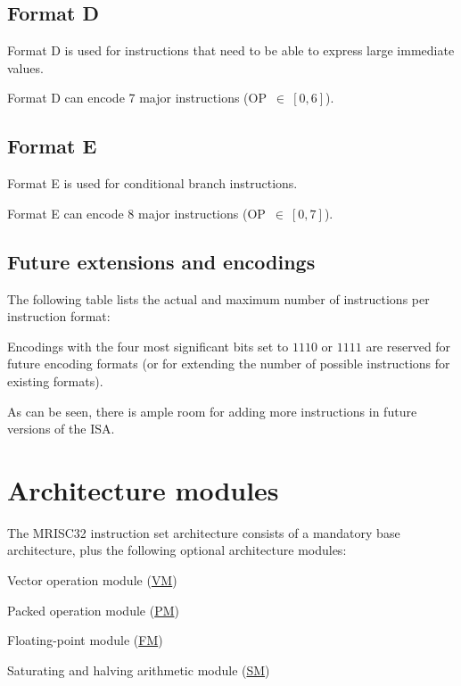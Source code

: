 \subsection{Format D}

Format D is used for instructions that need to be able to express large
immediate values.

Format D can encode 7 major instructions (OP~$\in~[0,6]$).

\subsection{Format E}

Format E is used for conditional branch instructions.

Format E can encode 8 major instructions (OP~$\in~[0,7]$).

\subsection{Future extensions and encodings}

The following table lists the actual and maximum number of instructions per
instruction format:



Encodings with the four most significant bits set to $1110$ or $1111$ are
reserved for future encoding formats (or for extending the number of possible
instructions for existing formats).

As can be seen, there is ample room for adding more instructions in future
versions of the ISA.

\section{Architecture modules}

The MRISC32 instruction set architecture consists of a mandatory base
architecture, plus the following optional architecture modules:

\begin{bulletitems}
  \item Vector operation module (\hyperref[module:VM]{VM})
  \item Packed operation module (\hyperref[module:PM]{PM})
  \item Floating-point module (\hyperref[module:FM]{FM})
  \item Saturating and halving arithmetic module (\hyperref[module:SM]{SM})
\end{bulletitems}
